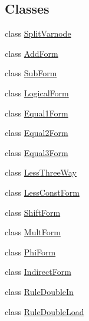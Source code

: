 \subsection*{Classes}
\begin{DoxyCompactItemize}
\item 
class \mbox{\hyperlink{class_split_varnode}{Split\+Varnode}}
\item 
class \mbox{\hyperlink{class_add_form}{Add\+Form}}
\item 
class \mbox{\hyperlink{class_sub_form}{Sub\+Form}}
\item 
class \mbox{\hyperlink{class_logical_form}{Logical\+Form}}
\item 
class \mbox{\hyperlink{class_equal1_form}{Equal1\+Form}}
\item 
class \mbox{\hyperlink{class_equal2_form}{Equal2\+Form}}
\item 
class \mbox{\hyperlink{class_equal3_form}{Equal3\+Form}}
\item 
class \mbox{\hyperlink{class_less_three_way}{Less\+Three\+Way}}
\item 
class \mbox{\hyperlink{class_less_const_form}{Less\+Const\+Form}}
\item 
class \mbox{\hyperlink{class_shift_form}{Shift\+Form}}
\item 
class \mbox{\hyperlink{class_mult_form}{Mult\+Form}}
\item 
class \mbox{\hyperlink{class_phi_form}{Phi\+Form}}
\item 
class \mbox{\hyperlink{class_indirect_form}{Indirect\+Form}}
\item 
class \mbox{\hyperlink{class_rule_double_in}{Rule\+Double\+In}}
\item 
class \mbox{\hyperlink{class_rule_double_load}{Rule\+Double\+Load}}
\end{DoxyCompactItemize}
